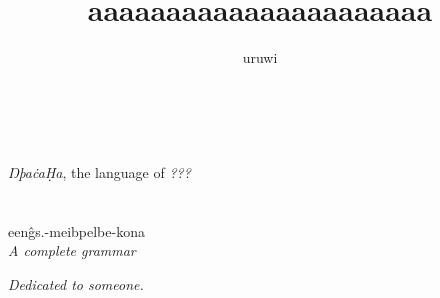\documentclass{book}
\title{aaaaaaaaaaaaaaaaaaaaaa}
\author{uruwi}
\newcommand{\lname}{ŊþaċaḤa}
\begin{document}
\pagecolor{LightSkyBlue2!25}

\begin{titlepage}
  \makeatletter
  \begin{center}
    {\color{DeepSkyBlue3} \hprule \vspace{1.5ex} \\}
    {\Huge \sffamily \textcolor{SteelBlue3}{\@title} \\}
    {\large \textit{\lname}, the language of \textit{???} \\}
    {\color{DeepSkyBlue3} \hprule \vspace{1.5ex} \\}
    \vspace{1.5cm}
    {\Large\bfseries \@author}\\[5pt]
    \vspace{2cm}
    \textnormal{een\^gs.-meibpelbe-kona} \\[5pt]
    \emph{A complete grammar}\\[2cm]
    \vfill
    \vfill
    {\@date}
  \end{center}
  \makeatother
\end{titlepage}

\pagecolor{LightSkyBlue2!15}

\begin{center}
    \textit{Dedicated to someone.}
\end{center}
\end{document}
